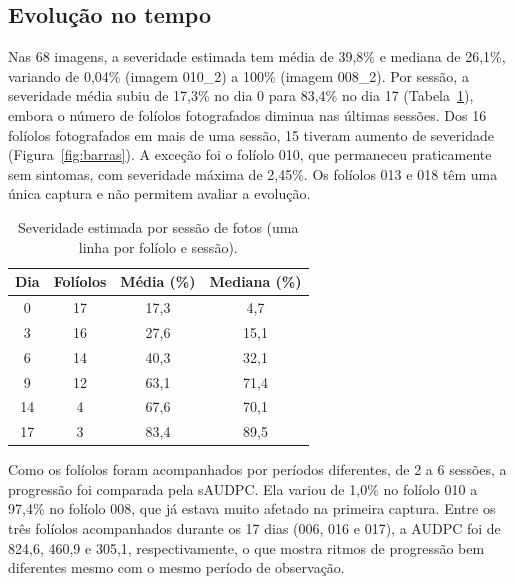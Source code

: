 \documentclass[10pt,a4paper,twocolumn]{article}
\begin{document}
\subsection{Evolução no tempo}

Nas 68 imagens, a severidade estimada tem média de 39,8\% e mediana de 26,1\%, variando de 0,04\% (imagem 010\_2) a 100\% (imagem 008\_2). Por sessão, a severidade média subiu de 17,3\% no dia 0 para 83,4\% no dia 17 (Tabela~\ref{tab:sessoes}), embora o número de folíolos fotografados diminua nas últimas sessões. Dos 16 folíolos fotografados em mais de uma sessão, 15 tiveram aumento de severidade (Figura~\ref{fig:barras}). A exceção foi o folíolo 010, que permaneceu praticamente sem sintomas, com severidade máxima de 2,45\%. Os folíolos 013 e 018 têm uma única captura e não permitem avaliar a evolução.

\begin{table}[H]
\centering
\caption{Severidade estimada por sessão de fotos (uma linha por folíolo e sessão).}
\label{tab:sessoes}
\small
\begin{tabular}{cccc}
\toprule
Dia & Folíolos & Média (\%) & Mediana (\%) \\
\midrule
0  & 17 & 17,3 & 4,7  \\
3  & 16 & 27,6 & 15,1 \\
6  & 14 & 40,3 & 32,1 \\
9  & 12 & 63,1 & 71,4 \\
14 & 4  & 67,6 & 70,1 \\
17 & 3  & 83,4 & 89,5 \\
\bottomrule
\end{tabular}
\end{table}

Como os folíolos foram acompanhados por períodos diferentes, de 2 a 6 sessões, a progressão foi comparada pela sAUDPC. Ela variou de 1,0\% no folíolo 010 a 97,4\% no folíolo 008, que já estava muito afetado na primeira captura. Entre os três folíolos acompanhados durante os 17 dias (006, 016 e 017), a AUDPC foi de 824,6, 460,9 e 305,1, respectivamente, o que mostra ritmos de progressão bem diferentes mesmo com o mesmo período de observação.
\end{document}
